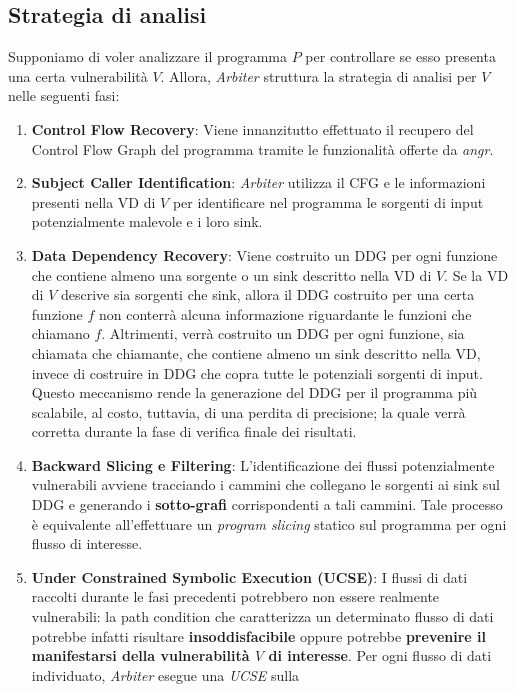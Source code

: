 \documentclass[../main.tex]{subfiles}
\begin{document}
\subsection{Strategia di analisi}
Supponiamo di voler analizzare il programma $P$ per controllare se esso presenta una certa vulnerabilità $V$.
Allora, \textit{Arbiter} struttura la strategia di analisi per $V$ nelle seguenti fasi:
\begin{enumerate}
    \item \textbf{Control Flow Recovery}: Viene innanzitutto effettuato il recupero del Control Flow Graph del programma tramite le funzionalità offerte da \textit{angr}.
    \item \textbf{Subject Caller Identification}: \textit{Arbiter} utilizza il CFG e le informazioni presenti nella VD di $V$ per identificare nel programma le sorgenti di input potenzialmente malevole e i loro sink. 
    \item \textbf{Data Dependency Recovery}: Viene costruito un DDG per ogni funzione che contiene almeno una sorgente o un sink descritto nella VD di $V$. 
    Se la VD di $V$ descrive sia sorgenti che sink, allora il DDG costruito per una certa funzione $f$ non conterrà alcuna informazione riguardante le funzioni che
    chiamano $f$. Altrimenti, verrà costruito un DDG per ogni funzione, sia chiamata che chiamante, che contiene almeno un sink descritto nella VD, invece di costruire in DDG che copra
    tutte le potenziali sorgenti di input. Questo meccanismo rende la generazione del DDG per il programma più scalabile, al costo, tuttavia, di una perdita di precisione; la quale verrà
    corretta durante la fase di verifica finale dei risultati.
    \item \textbf{Backward Slicing e Filtering}: L'identificazione dei flussi potenzialmente vulnerabili avviene tracciando i cammini che collegano le sorgenti ai sink sul DDG e generando i \textbf{sotto-grafi}
    corrispondenti a tali cammini. Tale processo è equivalente all'effettuare un \textit{program slicing} statico sul programma per ogni flusso di interesse.
    \item \textbf{Under Constrained Symbolic Execution (UCSE)}: I flussi di dati raccolti durante le fasi precedenti potrebbero non essere realmente vulnerabili: la path condition che caratterizza un determinato flusso di dati
    potrebbe infatti risultare \textbf{insoddisfacibile} oppure potrebbe \textbf{prevenire il manifestarsi della vulnerabilità $V$ di interesse}. Per ogni flusso di dati individuato, \textit{Arbiter} esegue una \textit{UCSE} sulla

\end{enumerate}
\end{document}
